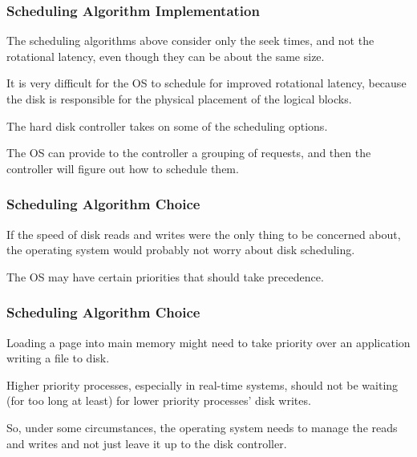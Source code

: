 \begin{frame}
\frametitle{Scheduling Algorithm Implementation}

The scheduling algorithms above consider only the seek times, and not the rotational latency, even though they can be about the same size. 

It is very difficult for the OS to schedule for improved rotational latency, because the disk is responsible for the physical placement of the logical blocks. 

The hard disk controller takes on some of the scheduling options. 

The OS can provide to the controller a grouping of requests, and then the controller will figure out how to schedule them.

\end{frame}

\begin{frame}
\frametitle{Scheduling Algorithm Choice}

If the speed of disk reads and writes were the only thing to be concerned about, the operating system would probably not worry about disk scheduling.

The OS may have certain priorities that should take precedence. 

\end{frame}

\begin{frame}
\frametitle{Scheduling Algorithm Choice}


Loading a page into main memory might need to take priority over an application writing a file to disk. 

Higher priority processes, especially in real-time systems, should not be waiting (for too long at least) for lower priority processes' disk writes. 

So, under some circumstances, the operating system needs to manage the reads and writes and not just leave it up to the disk controller.

\end{frame}



